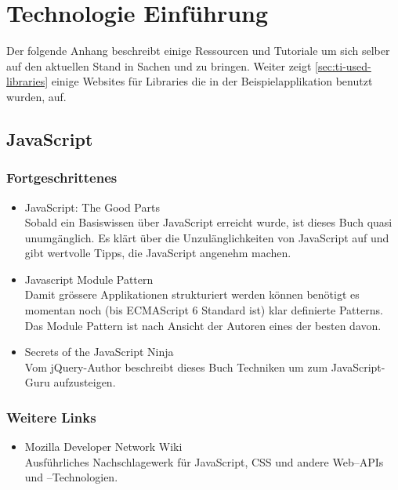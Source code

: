 \chapter{Technologie Einführung}

Der folgende Anhang beschreibt einige Ressourcen und Tutoriale um sich selber
auf den aktuellen Stand in Sachen  und  zu bringen.
Weiter zeigt \ref{sec:ti-used-libraries} einige Websites für Libraries die in der
Beispielapplikation benutzt wurden, auf.

\section{JavaScript}
\label{sec:ti-javascript}

\subsection*{Fortgeschrittenes}
\begin{itemize}
	\item JavaScript: The Good Parts \cite{Crockford:2008:JGP:1386753} \\
		Sobald ein Basiswissen über JavaScript erreicht wurde, ist dieses Buch
		quasi unumgänglich. Es klärt über die Unzulänglichkeiten von JavaScript
		auf und gibt wertvolle Tipps, die JavaScript angenehm machen.
	\item Javascript Module Pattern \cite{JSModulePattern} \\
		Damit grössere Applikationen strukturiert werden können benötigt es
		momentan noch (bis ECMAScript 6 Standard ist) klar definierte Patterns.
		Das Module Pattern ist nach Ansicht der Autoren eines der besten davon.
	\item Secrets of the JavaScript Ninja \cite{resig2012secrets} \\
		Vom jQuery-Author beschreibt dieses Buch Techniken um zum
		JavaScript-Guru aufzusteigen.
\end{itemize}

\subsection*{Weitere Links}
\begin{itemize}
	\item Mozilla Developer Network Wiki \cite{MDN} \\
		Ausführliches Nachschlagewerk für JavaScript, CSS und
		andere Web--APIs und --Technologien.
\end{itemize}

